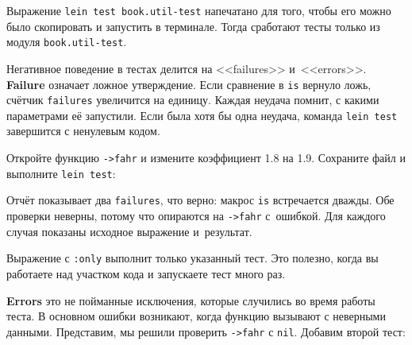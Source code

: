 
Выражение \verb|lein test book.util-test| напечатано для того, чтобы его можно
было скопировать и запустить в терминале. Тогда сработают тесты только из модуля
\verb|book.util-test|.

Негативное поведение в тестах делится на <<failures>>
и~<<errors>>. \textbf{Failure}  означает ложное утверждение. Если
сравнение в \verb|is| вернуло ложь, счётчик \verb|failures| увеличится на
единицу. Каждая неудача помнит, с какими параметрами её запустили. Если была
хотя бы одна неудача, команда \verb|lein test| завершится с ненулевым кодом.

Откройте функцию \verb|->fahr| и измените коэффициент 1.8 на 1.9. Сохраните
файл и выполните \verb|lein test|:

\begin{english}
\end{english}

Отчёт показывает два \verb|failures|, что верно: макрос \verb|is| встречается
дважды. Обе проверки неверны, потому что опираются на \verb|->fahr|
с~ошибкой. Для каждого случая показаны исходное выражение и~результат.

Выражение с \verb|:only| выполнит только указанный тест. Это полезно, когда вы
работаете над участком кода и запускаете тест много раз.

\begin{english}
\end{english}


\textbf{Errors} это не пойманные исключения, которые случились во время работы
теста. В основном ошибки возникают, когда функцию вызывают с неверными
данными. Представим, мы решили проверить \verb|->fahr| с \verb|nil|. Добавим
второй тест:

